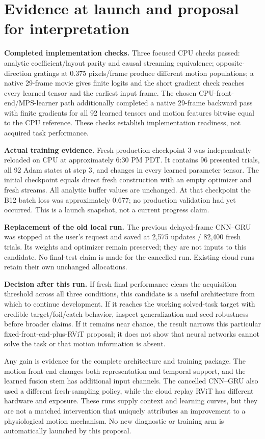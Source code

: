 \documentclass[11pt]{article}
\begin{document}
\section{Evidence at launch and proposal for interpretation}

\textbf{Completed implementation checks.} Three focused CPU checks passed: analytic coefficient/layout parity and causal streaming equivalence; opposite-direction gratings at 0.375 pixels/frame produce different motion populations; a native 29-frame movie gives finite logits and the short gradient check reaches every learned tensor and the earliest input frame. The chosen CPU-front-end/MPS-learner path additionally completed a native 29-frame backward pass with finite gradients for all 92 learned tensors and motion features bitwise equal to the CPU reference. These checks establish implementation readiness, not acquired task performance.

\textbf{Actual training evidence.} Fresh production checkpoint 3 was independently reloaded on CPU at approximately 6:30 PM PDT. It contains 96 presented trials, all 92 Adam states at step 3, and changes in every learned parameter tensor. The initial checkpoint equals direct fresh construction with an empty optimizer and fresh streams. All analytic buffer values are unchanged. At that checkpoint the B12 batch loss was approximately 0.677; no production validation had yet occurred. This is a launch snapshot, not a current progress claim.

\textbf{Replacement of the old local run.} The previous delayed-frame CNN--GRU was stopped at the user's request and saved at 2,575 updates / 82,400 fresh trials. Its weights and optimizer remain preserved; they are not inputs to this candidate. No final-test claim is made for the cancelled run. Existing cloud runs retain their own unchanged allocations.

\textbf{Decision after this run.} If fresh final performance clears the acquisition threshold across all three conditions, this candidate is a useful architecture from which to continue development. If it reaches the working solved-task target with credible target/foil/catch behavior, inspect generalization and seed robustness before broader claims. If it remains near chance, the result narrows this particular fixed-front-end-plus-RViT proposal; it does not show that neural networks cannot solve the task or that motion information is absent.

Any gain is evidence for the complete architecture and training package. The motion front end changes both representation and temporal support, and the learned fusion stem has additional input channels. The cancelled CNN--GRU also used a different fresh-sampling policy, while the cloud replay RViT has different hardware and exposure. These runs supply context and learning curves, but they are not a matched intervention that uniquely attributes an improvement to a physiological motion mechanism. No new diagnostic or training arm is automatically launched by this proposal.
\end{document}
